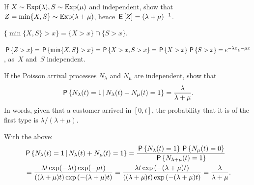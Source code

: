 \documentclass[queueing-book.tex]{subfiles}
\begin{document}
\begin{exercise}\label{ex:10}
 If  $X\sim\Exp{\lambda}, S\sim\Exp{\mu}$ and
 independent, show that $Z=\min\{X,S\}\sim\Exp{\lambda+\mu}$,
hence $\E Z = (\lambda+\mu)^{-1}$.
\begin{hint}
$\{\min\{X, S\}>x\} =\{X>x\} \cap\{S> x\}$.
\end{hint}
\begin{solution}
$\P{Z>x} = \P{\min\{X,S\}>x} = \P{X>x, S> x} = \P{X>x}\P{S>x}  = e^{-\lambda x} e^{-\mu x}$, as~$X$ and~$S$ independent.
\end{solution}
\end{exercise}


\begin{exercise}\label{ex:30a}
 If the Poisson arrival processes $N_\lambda$ and $N_\mu$ are independent, show that
 \begin{equation*}
 \P{N_\lambda(t) = 1 \given N_\lambda(t) + N_\mu(t) = 1} =
\frac{\lambda}{\lambda+\mu}.
 \end{equation*}
In words,  given that a customer arrived in $[0,t]$, the probability that it is of the first type is $\lambda/(\lambda+\mu)$.
\begin{solution}
 With the above:
 \begin{align*}
& \P{N_\lambda(t) = 1 \given N_\lambda(t) + N_\mu(t) = 1}
= \frac{\P{N_\lambda(t) = 1}\P{N_\mu(t) = 0}}{\P{N_{\lambda+\mu}(t) = 1}} \\
&= \frac{\lambda t \exp(-\lambda t) \exp(-\mu t)}{((\lambda+\mu)t)\exp{(-(\lambda+\mu)t)}}
= \frac{\lambda t \exp{(-(\lambda + \mu)t)}}{((\lambda+\mu)t)\exp{(-(\lambda+\mu)t)}}
= \frac{\lambda}{\lambda+\mu}.
 \end{align*}
\end{solution}
\end{exercise}
\end{document}
